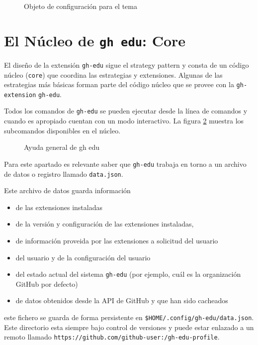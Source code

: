 \begin{figure}
    \centering
    \makebox[\textwidth][c]{\texttt{[image: ]}}
    \caption{Objeto de configuración para el tema}
    \label{fig:tailwindConfig}
\end{figure}




\section{El Núcleo de {\tt gh edu}: Core}

El diseño de la extensión \verb|gh-edu| sigue el \gls{strategy pattern} y consta de un código núcleo (\verb|core|) que coordina las estrategias y extensiones. Algunas de las estrategias más básicas forman parte del código núcleo que se provee con la \verb|gh-extension| \verb|gh-edu|.

Todos los comandos de \verb|gh-edu|  se pueden ejecutar desde la línea de comandos y cuando es apropiado cuentan con un modo interactivo. La figura \ref{fig:ghEduHelp} muestra los subcomandos disponibles en el núcleo.

\begin{figure}[h]
    \centering
    \caption{Ayuda general de gh edu}
    \label{fig:ghEduHelp}
\end{figure}

Para este apartado es relevante saber que \verb|gh-edu| trabaja en torno a un archivo de datos o registro llamado \verb|data.json|.

Este archivo de datos guarda información
\begin{itemize}
    \item de las extensiones instaladas 
    \item de la versión y configuración de las extensiones instaladas,
    \item de información proveida por las extensiones a solicitud del usuario
    \item del usuario y de la configuración del usuario 
    \item del estado actual del sistema \verb|gh-edu| (por ejemplo, cuál es la organización GitHub por defecto)
    \item de datos obtenidos desde la API de GitHub y que han sido cacheados
\end{itemize}
 este fichero se guarda de forma persistente en \verb|$HOME/.config/gh-edu/data.json|. Este directorio esta siempre bajo control de versiones y puede estar enlazado a un remoto llamado \verb|https://github.com/github-user:/gh-edu-profile|.


